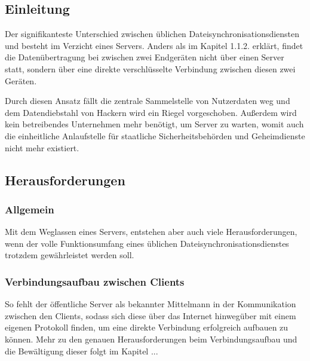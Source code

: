 \subsection{Einleitung}
Der signifikanteste Unterschied zwischen üblichen Dateisynchronisationsdiensten
und \sblit besteht im Verzicht eines Servers. Anders als im Kapitel 1.1.2. erklärt,
findet die Datenübertragung bei \sblit zwischen zwei Endgeräten nicht über einen Server statt,
sondern über eine direkte verschlüsselte Verbindung zwischen diesen zwei Geräten.

Durch diesen Ansatz fällt die zentrale Sammelstelle von Nutzerdaten
weg und dem Datendiebstahl von Hackern wird ein Riegel vorgeschoben. Außerdem
wird kein betreibendes Unternehmen mehr benötigt, um Server zu warten, womit auch
die einheitliche Anlaufstelle für staatliche Sicherheitsbehörden und Geheimdienste
nicht mehr existiert.

\subsection{Herausforderungen}
\subsubsection{Allgemein}
Mit dem Weglassen eines Servers, entstehen aber auch viele Herausforderungen,
wenn der volle Funktionsumfang eines üblichen Dateisynchronisationsdienstes
trotzdem gewährleistet werden soll.

\subsubsection{Verbindungsaufbau zwischen Clients}
So fehlt der öffentliche Server als bekannter \glqq{} Mittelmann \grqq{} in der Kommunikation
zwischen den Clients, sodass sich diese über das Internet hinwegüber mit einem
eigenen Protokoll finden, um eine direkte Verbindung erfolgreich aufbauen zu können.
Mehr zu den genauen Herausforderungen beim Verbindungsaufbau und
die Bewältigung dieser folgt im Kapitel ...
